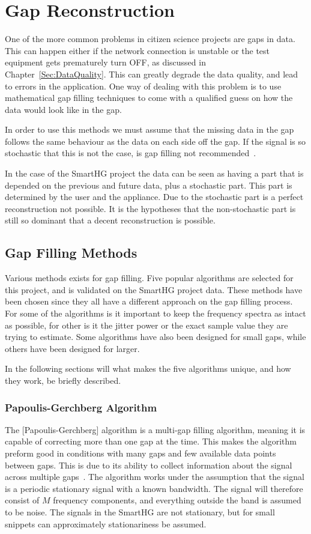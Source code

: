 \chapter{Gap Reconstruction}
\label{Sec:GapFill}
One of the more common problems in citizen science projects are gaps in data. This can happen either if the network connection is unstable or the test equipment gets prematurely turn OFF, as discussed in Chapter~\ref{Sec:DataQuality}. This can greatly degrade the data quality, and lead to errors in the application. One way of dealing with this problem is to use mathematical gap filling techniques to come with a qualified guess on how the data would look like in the gap. 

In order to use this methods we must assume that the missing data in the gap follows the same behaviour as the data on each side off the gap. If the signal is so stochastic that this is not the case, is gap filling not recommended~\citep{RefWorks:10}. 

In the case of the SmartHG project the data can be seen as having a part that is depended on the previous and future data, plus a stochastic part. This part is determined by the user and the appliance. Due to the stochastic part is a perfect reconstruction not possible. It is the hypotheses that the non-stochastic part is still so dominant that a decent reconstruction is possible.

\section{Gap Filling Methods}
\label{T:GapFilling}
Various methods exists for gap filling. Five popular algorithms are selected for this project, and is validated on the SmartHG project data. These methods have been chosen since they all have a different approach on the gap filling process. For some of the algorithms is it important to keep the frequency spectra as intact as possible, for other is it the jitter power or the exact sample value they are trying to estimate. Some algorithms have also been designed for small gaps, while others have been designed for larger. 

In the following sections will what makes the five algorithms unique, and how they work, be briefly described.

\subsection{Papoulis-Gerchberg Algorithm}
\label{T:PGA}
The [Papoulis-Gerchberg] algorithm is a multi-gap filling algorithm, meaning it is capable of correcting more than one gap at the time. This makes the algorithm preform good in conditions with many gaps and few available data points between gaps. This is due to its ability to collect information about the signal across multiple gaps~\citep{RefWorks:11}. The  algorithm works under the assumption that the signal is a periodic stationary signal with a known bandwidth. The signal will therefore consist of $M$ frequency components, and everything outside the band is assumed to be noise. The signals in the SmartHG are not stationary, but for small snippets can approximately stationariness be assumed. 

